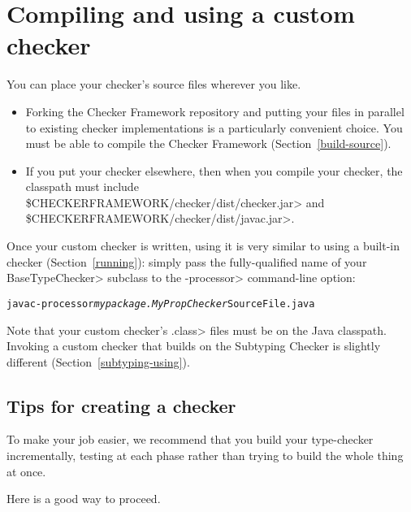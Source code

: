 \section{Compiling and using a custom checker\label{creating-compiling}}

You can place your checker's source files wherever you like.
\begin{itemize}
\item
  Forking the Checker Framework repository and putting your files in
  parallel to existing checker implementations is a particularly convenient
  choice.  You must be able to compile the Checker Framework
  (Section~\ref{build-source}).
\item
  \begin{sloppypar}
  If you put your checker elsewhere, then when you compile your checker,
  the classpath must include \<\$CHECKERFRAMEWORK/checker/dist/checker.jar>
  and \<\$CHECKERFRAMEWORK/checker/dist/javac.jar>.
  \end{sloppypar}
\end{itemize}


Once your custom checker is written, using it is very similar to using a
built-in checker (Section~\ref{running}):
simply pass the fully-qualified name of your \<BaseTypeChecker>
subclass to the \<-processor> command-line option:
\begin{alltt}
  javac -processor \textit{mypackage.MyPropChecker} SourceFile.java
\end{alltt}
Note that your custom checker's
\<.class> files must be on the Java classpath.
Invoking a custom checker that builds on
the Subtyping Checker is slightly different (Section~\ref{subtyping-using}).



\subsection{Tips for creating a checker\label{creating-tips}}

To make your job easier, we recommend that you build your type-checker
incrementally, testing at each phase rather than trying to build the whole
thing at once.

Here is a good way to proceed.

